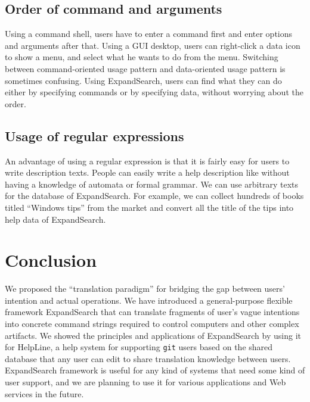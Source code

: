 \documentclass[manuscript,anonymous,review]{acmart}
\def\HL{\textsf{HelpLine}}
\def\GIT{\texttt{git}}
\def\ES{\textsf{ExpandSearch}}
\begin{document}
\subsection*{Order of command and arguments}

Using a command shell,
users have to enter a command first and enter options and arguments after that.
Using a GUI desktop,
users can right-click a data icon to show a menu,
and select what he wants to do from the menu.
Switching between command-oriented usage pattern and
data-oriented usage pattern is sometimes confusing.
Using {\ES}, users can find what they can do
either by specifying commands or by specifying data, 
without worrying about the order.

\subsection*{Usage of regular expressions}

An advantage of using a regular expression is that
it is fairly easy for users to write description texts.
People can easily write a help description like
without having a knowledge of automata or formal grammar.
We can use arbitrary texts for the database of {\ES}.
For example,
we can collect hundreds of books titled ``Windows tips'' from the market
and convert all the title of the tips into help data of {\ES}.

\section{Conclusion}

We proposed the ``translation paradigm'' for bridging the gap between
users' intention and actual operations.
%
We have introduced a general-purpose flexible framework {\ES}
that can translate fragments of user's vague intentions into
concrete command strings required to control computers and
other complex artifacts.
We showed the principles and applications of {\ES} by using it
for {\HL}, a help system for supporting {\GIT} users
based on the shared database that any user can edit to share
translation knowledge between users.
%
{\ES} framework is useful for any kind of systems that need
some kind of user support, and we are planning to use it
for various applications and Web services in the future.

% 
% 


\newpage



\end{document}
